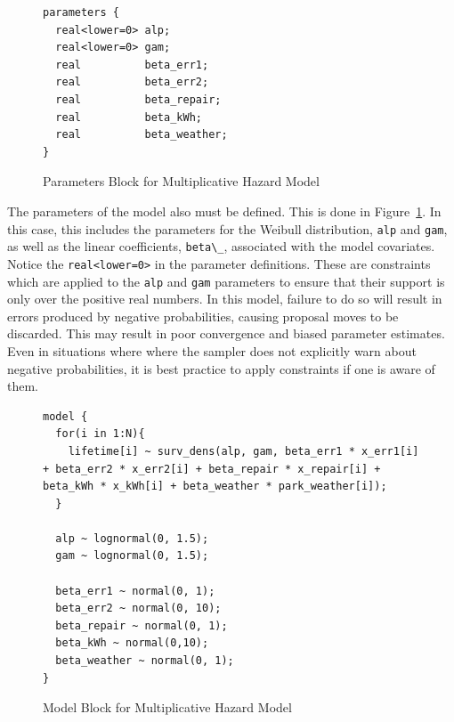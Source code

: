 \begin{figure}[htbp]
    \centering
    \begin{lstlisting}[belowskip=-2 \baselineskip]
parameters {
  real<lower=0> alp;
  real<lower=0> gam;
  real          beta_err1;
  real          beta_err2;
  real          beta_repair;
  real          beta_kWh;
  real          beta_weather;
}
    \end{lstlisting}
    \caption{Parameters Block for Multiplicative Hazard Model}
    \label{mhaz_params}
\end{figure}


The parameters of the model also must be defined. This is done in Figure~\ref{mhaz_params}. In this case, this includes the parameters for the Weibull distribution, \lstinline{alp} and \lstinline{gam}, as well as the linear coefficients, \lstinline{beta\_}, associated with the model covariates. Notice the \lstinline{real<lower=0>} in the parameter definitions. These are constraints which are applied to the \lstinline{alp} and \lstinline{gam} parameters to ensure that their support is only over the positive real numbers. In this model, failure to do so will result in errors produced by negative probabilities, causing proposal moves to be discarded. This may result in poor convergence and biased parameter estimates. Even in situations where where the sampler does not explicitly warn about negative probabilities, it is best practice to apply constraints if one is aware of them.

\begin{figure}[htbp]
    \centering
    \begin{lstlisting}[belowskip=-2 \baselineskip]
model {
  for(i in 1:N){
    lifetime[i] ~ surv_dens(alp, gam, beta_err1 * x_err1[i] + beta_err2 * x_err2[i] + beta_repair * x_repair[i] + beta_kWh * x_kWh[i] + beta_weather * park_weather[i]);
  }

  alp ~ lognormal(0, 1.5);
  gam ~ lognormal(0, 1.5);
  
  beta_err1 ~ normal(0, 1);
  beta_err2 ~ normal(0, 10);
  beta_repair ~ normal(0, 1);
  beta_kWh ~ normal(0,10);
  beta_weather ~ normal(0, 1);
}
    \end{lstlisting}
    \caption{Model Block for Multiplicative Hazard Model}
    \label{mhaz_model}
\end{figure}


